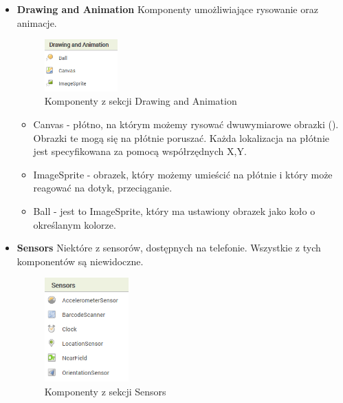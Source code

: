 \begin{itemize}
\item \textbf{Drawing and Animation} Komponenty umożliwiające rysowanie oraz animacje.

\begin{figure}[H] 
\centering\includegraphics[height=2cm]{figures/components/drawing}
\caption{Komponenty z sekcji Drawing and Animation}
\end{figure}

\begin{itemize}
\item Canvas - płótno, na którym możemy rysować dwuwymiarowe obrazki (). Obrazki te mogą się na płótnie poruszać. Każda lokalizacja na płótnie jest specyfikowana za pomocą współrzędnych X,Y.
\item ImageSprite - obrazek, który możemy umieścić na płótnie i który może reagować na dotyk, przeciąganie.
\item Ball - jest to ImageSprite, który ma ustawiony obrazek jako koło o określanym kolorze.
\end{itemize}

\item \textbf{Sensors} Niektóre z sensorów, dostępnych na telefonie. Wszystkie z tych komponentów są niewidoczne.

\begin{figure}[H] 
\centering\includegraphics[height=4cm]{figures/components/sensors}
\caption{Komponenty z sekcji Sensors}
\end{figure}


\end{itemize}
